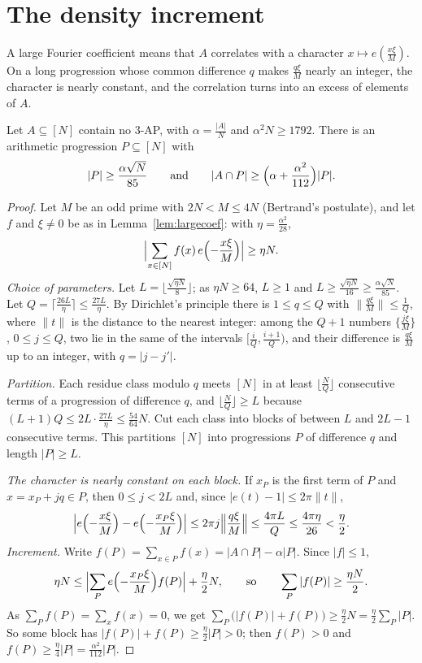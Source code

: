 \section{The density increment}

A large Fourier coefficient means that $A$ correlates with a character $x\mapsto e(\frac{x\xi}M)$. On a long progression whose common difference $q$ makes $\frac{q\xi}M$ nearly an integer, the character is nearly constant, and the correlation turns into an excess of elements of $A$.

\begin{lemma}\label{lem:increment}
Let $A\subseteq[N]$ contain no $3$-AP, with $\alpha=\frac{|A|}N$ and $\alpha^2N\ge1792$. There is an arithmetic progression $P\subseteq[N]$ with
\[
|P|\ge\frac{\alpha\sqrt N}{85}\qquad\text{and}\qquad|A\cap P|\ge\Bigl(\alpha+\frac{\alpha^2}{112}\Bigr)|P|.
\]
\end{lemma}
\begin{proof}
Let $M$ be an odd prime with $2N<M\le4N$ (Bertrand's postulate), and let $f$ and $\xi\ne0$ be as in Lemma~\ref{lem:largecoef}: with $\eta=\frac{\alpha^2}{28}$,
\[
\Bigl|\sum_{x\in[N]}f(x)\,e\Bigl(-\frac{x\xi}M\Bigr)\Bigr|\ge\eta N.
\]
\emph{Choice of parameters.} Let $L=\lfloor\frac{\sqrt{\eta N}}8\rfloor$; as $\eta N\ge64$, $L\ge1$ and $L\ge\frac{\sqrt{\eta N}}{16}\ge\frac{\alpha\sqrt N}{85}$. Let $Q=\lceil\frac{26L}\eta\rceil\le\frac{27L}\eta$. By Dirichlet's principle there is $1\le q\le Q$ with $\|\frac{q\xi}M\|\le\frac1Q$, where $\|t\|$ is the distance to the nearest integer: among the $Q+1$ numbers $\{\frac{j\xi}M\}$, $0\le j\le Q$, two lie in the same of the intervals $[\frac iQ,\frac{i+1}Q)$, and their difference is $\frac{q\xi}M$ up to an integer, with $q=|j-j'|$.

\emph{Partition.} Each residue class modulo $q$ meets $[N]$ in at least $\lfloor\frac NQ\rfloor$ consecutive terms of a progression of difference $q$, and $\lfloor\frac NQ\rfloor\ge L$ because $(L+1)Q\le2L\cdot\frac{27L}\eta\le\frac{54}{64}N$. Cut each class into blocks of between $L$ and $2L-1$ consecutive terms. This partitions $[N]$ into progressions $P$ of difference $q$ and length $|P|\ge L$.

\emph{The character is nearly constant on each block.} If $x_P$ is the first term of $P$ and $x=x_P+jq\in P$, then $0\le j<2L$ and, since $|e(t)-1|\le2\pi\|t\|$,
\[
\Bigl|e\Bigl(-\frac{x\xi}M\Bigr)-e\Bigl(-\frac{x_P\xi}M\Bigr)\Bigr|\le2\pi j\Bigl\|\frac{q\xi}M\Bigr\|\le\frac{4\pi L}Q\le\frac{4\pi\eta}{26}<\frac\eta2.
\]
\emph{Increment.} Write $f(P)=\sum_{x\in P}f(x)=|A\cap P|-\alpha|P|$. Since $|f|\le1$,
\[
\eta N\le\Bigl|\sum_Pe\Bigl(-\frac{x_P\xi}M\Bigr)f(P)\Bigr|+\frac\eta2N,\qquad\text{so}\qquad\sum_P|f(P)|\ge\frac{\eta N}2.
\]
As $\sum_Pf(P)=\sum_xf(x)=0$, we get $\sum_P\bigl(|f(P)|+f(P)\bigr)\ge\frac\eta2N=\frac\eta2\sum_P|P|$. So some block has $|f(P)|+f(P)\ge\frac\eta2|P|>0$; then $f(P)>0$ and $f(P)\ge\frac\eta4|P|=\frac{\alpha^2}{112}|P|$.
\end{proof}

